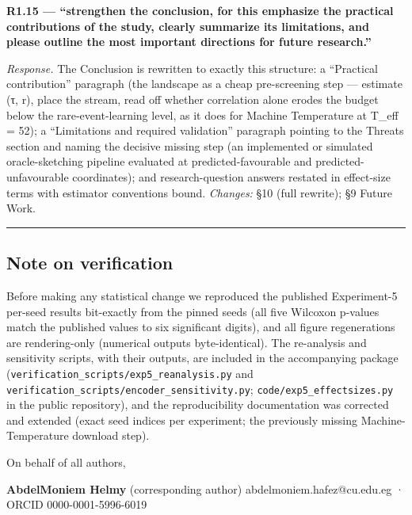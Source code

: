 \documentclass[
  11pt,
]{article}
\begin{document}
\textbf{R1.15 --- ``strengthen the conclusion, for this emphasize the
practical contributions of the study, clearly summarize its limitations,
and please outline the most important directions for future research.''}

\emph{Response.} The Conclusion is rewritten to exactly this structure:
a ``Practical contribution'' paragraph (the landscape as a cheap
pre-screening step --- estimate (τ, r), place the stream, read off
whether correlation alone erodes the budget below the
rare-event-learning level, as it does for Machine Temperature at T\_eff
= 52); a ``Limitations and required validation'' paragraph pointing to
the Threats section and naming the decisive missing step (an implemented
or simulated oracle-sketching pipeline evaluated at predicted-favourable
and predicted-unfavourable coordinates); and research-question answers
restated in effect-size terms with estimator conventions bound.
\emph{Changes:} §10 (full rewrite); §9 Future Work.

\begin{center}\rule{0.5\linewidth}{0.5pt}\end{center}

\subsection{Note on verification}\label{note-on-verification}

Before making any statistical change we reproduced the published
Experiment-5 per-seed results bit-exactly from the pinned seeds (all
five Wilcoxon p-values match the published values to six significant
digits), and all figure regenerations are rendering-only (numerical
outputs byte-identical). The re-analysis and sensitivity scripts, with
their outputs, are included in the accompanying package
(\texttt{verification\_scripts/exp5\_reanalysis.py} and
\texttt{verification\_scripts/encoder\_sensitivity.py};
\texttt{code/exp5\_effectsizes.py} in the public repository), and the
reproducibility documentation was corrected and extended (exact seed
indices per experiment; the previously missing Machine-Temperature
download step).

On behalf of all authors,

\textbf{AbdelMoniem Helmy} (corresponding author)
abdelmoniem.hafez@cu.edu.eg · ORCID 0000-0001-5996-6019
\end{document}
